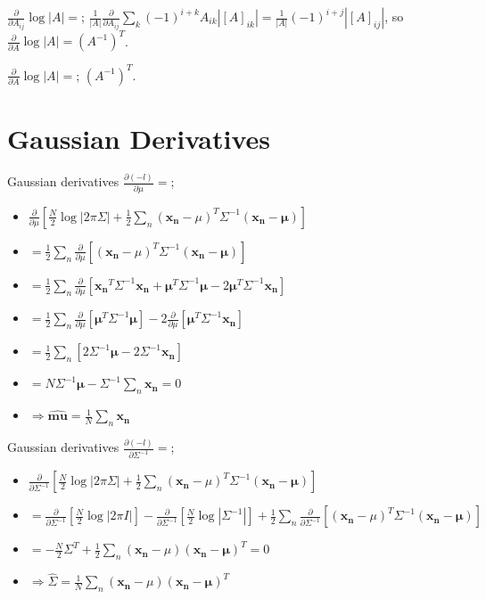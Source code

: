 \documentclass{article}
\begin{document}
$\frac{\partial}{\partial A_{ij}}\log|A|=$; $\frac{1}{|A|}\frac{\partial}{\partial A_{ij}}\sum_{k}(-1)^{i+k}A_{ik}|[A]_{ik}|=\frac{1}{|A|}(-1)^{i+j}|[A]_{ij}|$, so \newline $\frac{\partial}{\partial A}\log|A| = (A^{-1})^T$.

$\frac{\partial}{\partial A}\log|A| =$; $(A^{-1})^T$.

\section{Gaussian Derivatives} 

Gaussian derivatives $\frac{\partial(-l)}{\partial\mu}= $; \begin{itemize} \item $\frac{\partial}{\partial\mu}[\frac{N}{2}\log|2\pi\Sigma|+\frac{1}{2}\sum_n(\mathbf{x_n}-\mu)^T\Sigma^{-1}(\mathbf{x_n-\mu})]$ \item $=\frac{1}{2}\sum_n\frac{\partial}{\partial\mu}[ (\mathbf{x_n}-\mu)^T\Sigma^{-1}(\mathbf{x_n-\mu})]$ \item $=\frac{1}{2}\sum_n\frac{\partial}{\partial\mu}[\mathbf{x_n}^T\Sigma^{-1}\mathbf{x_n}+\mathbf{\mu}^T\Sigma^{-1}\mathbf{\mu}-2\mathbf{\mu}^T\Sigma^{-1}\mathbf{x_n}]$ \item $=\frac{1}{2}\sum_n\frac{\partial}{\partial\mu}[\mathbf{\mu}^T\Sigma^{-1}\mathbf{\mu}] - 2\frac{\partial}{\partial\mu}[\mathbf{\mu}^T\Sigma^{-1}\mathbf{x_n}]$  \item $=\frac{1}{2}\sum_n[2\Sigma^{-1}\mathbf{\mu} - 2\Sigma^{-1}\mathbf{x_n}]$ \item $=N\Sigma^{-1}\mathbf{\mu} - \Sigma^{-1}\sum_n\mathbf{x_n}=0$ \item $\Rightarrow \hat{\mathbf{mu}} = \frac{1}{N}\sum_n\mathbf{x_n}$ \end{itemize} 

Gaussian derivatives $\frac{\partial(-l)}{\partial\Sigma^{-1}} = $; \begin{itemize} \item $\frac{\partial}{\partial\Sigma^{-1}}[\frac{N}{2}\log|2\pi\Sigma|+\frac{1}{2}\sum_n(\mathbf{x_n}-\mu)^T\Sigma^{-1}(\mathbf{x_n-\mu})]$ \item  $=\frac{\partial}{\partial\Sigma^{-1}}[\frac{N}{2}\log|2\pi I|] - \frac{\partial}{\partial\Sigma^{-1}}[\frac{N}{2}\log|\Sigma^{-1}|]+\frac{1}{2}\sum_n\frac{\partial}{\partial\Sigma^{-1}}[(\mathbf{x_n}-\mu)^T\Sigma^{-1}(\mathbf{x_n-\mu})]$ \item $ = -\frac{N}{2}\Sigma^T+\frac{1}{2}\sum_n (\mathbf{x_n}-\mu)(\mathbf{x_n-\mu})^T = 0$ \item $\Rightarrow \hat{\Sigma}=\frac{1}{N}\sum_n(\mathbf{x_n}-\mu)(\mathbf{x_n-\mu})^T$ \end{itemize}
\end{document}

